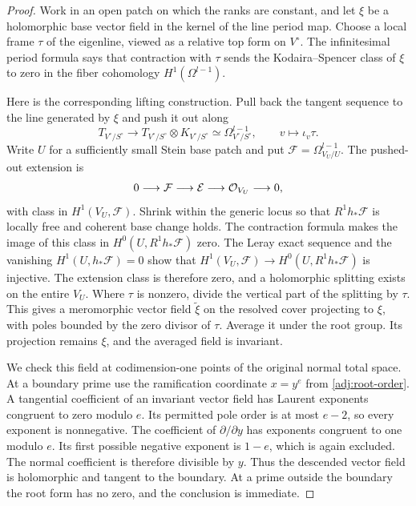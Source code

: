 \begin{proof}
Work in an open patch on which the ranks are constant, and let $\xi$
be a holomorphic base vector field in the kernel of the line period
map.  Choose a local frame $\tau$ of the eigenline, viewed as a
relative top form on $V^\circ$.  The infinitesimal period formula says
that contraction with $\tau$ sends the Kodaira--Spencer class of $\xi$
to zero in the fiber cohomology $H^1(\Omega^{l-1})$.

Here is the corresponding lifting construction.  Pull back the tangent
sequence to the line generated by $\xi$ and push it out along
\[
 T_{V^\circ/S^\circ}\longrightarrow
 T_{V^\circ/S^\circ}\otimes K_{V^\circ/S^\circ}
       \simeq\Omega^{l-1}_{V^\circ/S^\circ},
 \qquad v\longmapsto\iota_v\tau.
\]
Write $U$ for a sufficiently small Stein base patch and put
$\mathcal F=\Omega^{l-1}_{V_U/U}$.  The pushed-out extension is
\[
             0\longrightarrow\mathcal F
               \longrightarrow\mathcal E
               \longrightarrow\mathcal O_{V_U}\longrightarrow0,
\]
with class in $H^1(V_U,\mathcal F)$.  Shrink within the generic locus
so that $R^1h_*\mathcal F$ is locally free and coherent base change
holds.  The contraction formula makes the image of this class in
$H^0(U,R^1h_*\mathcal F)$ zero.  The Leray exact sequence and the
vanishing $H^1(U,h_*\mathcal F)=0$ show that
$H^1(V_U,\mathcal F)\to H^0(U,R^1h_*\mathcal F)$ is injective.
The extension class is therefore zero, and a holomorphic splitting
exists on the entire $V_U$.
Where $\tau$ is nonzero, divide the vertical part of the splitting by
$\tau$.  This gives a meromorphic vector field $\widetilde\xi$ on the
resolved cover projecting to $\xi$, with poles bounded by the zero
divisor of $\tau$.  Average it under the root group.  Its projection
remains $\xi$, and the averaged field is invariant.

We check this field at codimension-one points of the original normal
total space.  At a boundary prime use the ramification coordinate
$x=y^e$ from \eqref{adj:root-order}.  A tangential coefficient of an
invariant vector field has Laurent exponents congruent to zero modulo
$e$.  Its permitted pole order is at most $e-2$, so every exponent is
nonnegative.  The coefficient of $\partial/\partial y$ has exponents
congruent to one modulo $e$.  Its first possible negative exponent is
$1-e$, which is again excluded.  The normal coefficient is therefore
divisible by $y$.  Thus the descended vector field is holomorphic and
tangent to the boundary.  At a prime outside the boundary the root
form has no zero, and the conclusion is immediate.


\end{proof}
